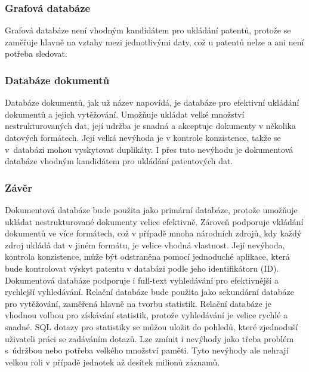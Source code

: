 \subsubsection{Grafová databáze}
Grafová databáze není vhodným kandidátem pro ukládání patentů, protože se zaměřuje hlavně na vztahy mezi jednotlivými daty, což u patentů nelze a ani není potřeba sledovat.

\subsubsection{Databáze dokumentů}
Databáze dokumentů, jak už název napovídá, je databáze pro efektivní ukládání dokumentů a jejich vytěžování. Umožňuje ukládat velké množství nestrukturovaných dat, její udržba je snadná a akceptuje dokumenty v několika datových formátech. Její velká nevýhoda je v kontrole konzistence, takže se v~databázi mohou vyskytovat duplikáty. I přes tuto nevýhodu je dokumentová databáze vhodným kandidátem pro ukládání patentových dat.

\subsubsection{Závěr}
Dokumentová databáze bude použita jako primární databáze, protože umožňuje ukládat nestrukturované dokumenty velice efektivně. Zároveň podporuje vkládání dokumentů ve více formátech, což v případě mnoha národních zdrojů, kdy každý zdroj ukládá dat v jiném formátu, je velice vhodná vlastnost. Její nevýhoda, kontrola konzistence, může být odstraněna pomocí jednoduché aplikace, která bude kontrolovat výskyt patentu v databázi podle jeho identifikátoru (ID). Dokumentová databáze podporuje i full-text vyhledávání pro efektivnější a rychlejší vyhledávání.
\newline
\indent Relační databáze bude použita jako sekundární databáze pro vytěžování, zaměřená hlavně na tvorbu statistik. Relační databáze je vhodnou volbou pro získávání statistik, protože vyhledávání je velice rychlé a snadné. \gls{SQL} dotazy pro statistiky se můžou uložit do pohledů, které zjednoduší uživateli práci se zadáváním dotazů. Lze zmínit i nevýhody jako třeba problém s~údržbou nebo potřeba velkého množství paměti. Tyto nevýhody ale nehrají velkou roli v případě jednotek až desítek milionů záznamů.

